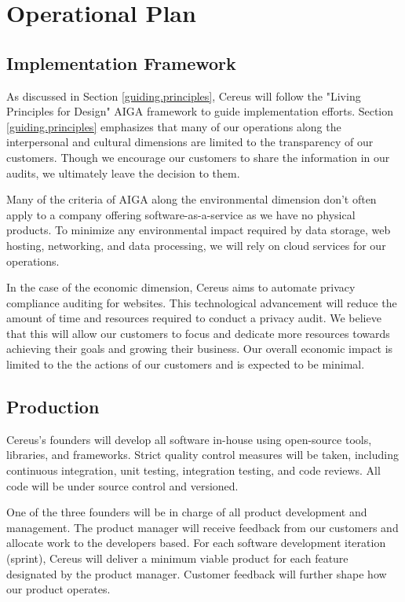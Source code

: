{\let\cleardoublepage\relax \chapter{Operational Plan}}

\section{Implementation Framework}

As discussed in Section \ref{guiding.principles}, Cereus will follow the "Living Principles for Design" AIGA framework \cite{brink.aiga.2020} to guide implementation efforts. Section \ref{guiding.principles} emphasizes that many of our operations along the interpersonal and cultural dimensions are limited to the transparency of our customers. Though we encourage our customers to share the information in our audits, we ultimately leave the decision to them.

Many of the criteria of AIGA along the environmental dimension don't often apply to a company offering software-as-a-service as we have no physical products. To minimize any environmental impact required by data storage, web hosting, networking, and data processing, we will rely on cloud services for our operations.

In the case of the economic dimension, Cereus aims to automate privacy compliance auditing for websites. This technological advancement will reduce the amount of time and resources required to conduct a privacy audit. We believe that this will allow our customers to focus and dedicate more resources towards achieving their goals and growing their business. Our overall economic impact is limited to the the actions of our customers and is expected to be minimal.

\section{Production}

Cereus's founders will develop all software in-house using open-source tools, libraries, and frameworks. Strict quality control measures will be taken, including continuous integration, unit testing, integration testing, and code reviews. All code will be under source control and versioned.

One of the three founders will be in charge of all product development and management. The product manager will receive feedback from our customers and allocate work to the developers based. For each software development iteration (sprint), Cereus will deliver a minimum viable product for each feature designated by the product manager. Customer feedback will further shape how our product operates.

